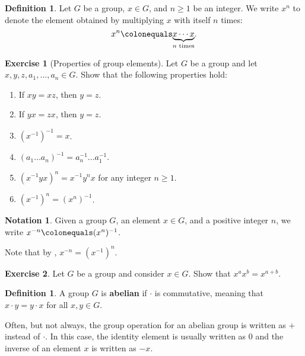 \documentclass[12pt]{report}
\numberwithin{equation}{section}
\numberwithin{theorem}{chapter}
\theoremstyle{definition}
\newtheorem{definition}[theorem]{Definition}
\newtheorem{exercise}{Exercise}
\newtheorem*{basic properties}{Basic Properties}
\newtheorem*{Important Remark}{Important Remark}
\newtheorem{notation}[theorem]{Notation}
\begin{document}
\begin{definition}
	Let $G$ be a group, $x \in G$, and $n \geqslant 1$ be an integer. We write $x^n$ to denote the element obtained by multiplying $x$ with itself $n$ times:
	$$x^n \colonequals \underset{n \textrm{ times}}{\underbrace{x \cdots x}}.$$
\end{definition}

\newpage

\begin{exercise}[Properties of group elements]\label{exercise properties of group elements}
Let $G$ be a group and let $x,y,z, a_1,\ldots,a_n \in G$. Show that the following properties hold: 
\begin{enumerate}
\item If $xy = xz$, then $y=z$. 
\item If $yx = zx$, then $y = z$. 
\item $(x^{-1})^{-1} = x$. 
\item $(a_1 \dots a_n)^{-1} = a_n^{-1} \dots a_1^{-1}$. 
\item $(x^{-1}yx)^n = x^{-1}y^nx$ for any integer $n \geqslant 1$.
\item $(x^{-1})^n = (x^n)^{-1}$.
\end{enumerate}
\end{exercise}

\begin{notation}
	Given a group $G$, an element $x \in G$, and a positive integer $n$, we write $x^{-n} \colonequals (x^n)^{-1}$.
\end{notation}

Note that by , $x^{-n} = (x^{-1})^n$.

\begin{exercise}
	Let $G$ be a group and consider $x \in G$. Show that $x^ax^b = x^{a+b}$.
\end{exercise}

\begin{definition}
	A group $G$ is {\bf abelian} if $\cdot$ is commutative, meaning that $x \cdot y = y \cdot x$ for all $x,y \in G$.
\end{definition}

Often, but not always, the group operation for an abelian group is written as $+$ instead of $\cdot$. In this case, the identity element is usually written as $0$ and the inverse of an element $x$ is written as $-x$. 
\end{document}
